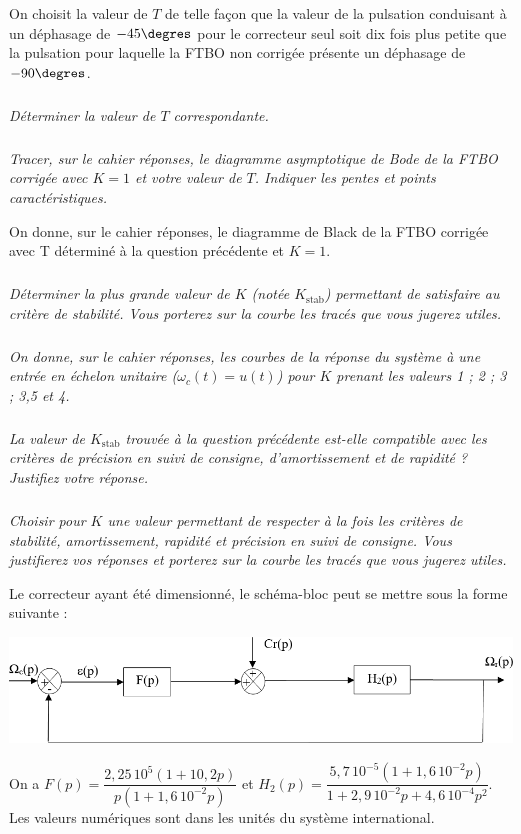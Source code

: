 \documentclass[10pt,fleqn]{article} %
\begin{document}
\begin{multicols}{2}
On choisit la valeur de $T$ de telle façon que la valeur de la pulsation conduisant à un déphasage de $-45\degres$ pour le correcteur seul soit dix fois plus petite que la pulsation pour laquelle la FTBO non corrigée présente un déphasage de $-90\degres$.
\subparagraph{}
\textit{Déterminer la valeur de $T$ correspondante.}

\subparagraph{}
\textit{Tracer, sur le cahier réponses, le diagramme asymptotique de Bode de la FTBO corrigée avec $K = 1$ et votre valeur de $T$. Indiquer les pentes et points caractéristiques.}

On donne, sur le cahier réponses, le diagramme de Black de la FTBO corrigée avec T déterminé à la question précédente et $K = 1$.


\subparagraph{}
\textit{Déterminer la plus grande valeur de $K$ (notée $K_{\text{stab}}$) permettant de satisfaire au critère de stabilité. Vous porterez sur la courbe les tracés que vous jugerez utiles.}

\subparagraph{}
\textit{On donne, sur le cahier réponses, les courbes de la réponse du système à une entrée en échelon unitaire ($\omega_c(t) = u(t)$) pour $K$ prenant les valeurs 1 ; 2 ; 3 ; 3,5 et 4.}


\subparagraph{}
\textit{La valeur de $K_{\text{stab}}$ trouvée à la question précédente est-elle compatible avec les critères de précision en suivi de consigne, d'amortissement et de rapidité ? Justifiez votre réponse.}

\subparagraph{}
\textit{Choisir pour $K$ une valeur permettant de respecter à la fois les critères de stabilité, amortissement, rapidité et précision en suivi de consigne. Vous justifierez vos réponses et porterez sur la courbe les tracés que vous jugerez utiles.}

 
Le correcteur ayant été dimensionné, le schéma-bloc peut se mettre sous la forme suivante :
\begin{center}
\includegraphics[width=.8\linewidth]{images/e3a_09.png}
\end{center}

On a $F(p)=\dfrac{2,25\, 10^{5}\left(1+ 10,2 p\right)}{p\left(1+1,6\, 10^{-2}p\right)}$ et $H_2(p)=\dfrac{5,7\, 10^{-5}\left(1+ 1,6\, 10^{-2}p\right)}{1+2,9\, 10^{-2}p+4,6\, 10^{-4}p^2}$. Les valeurs numériques sont dans les unités du système international.



\end{multicols}
\end{document}
